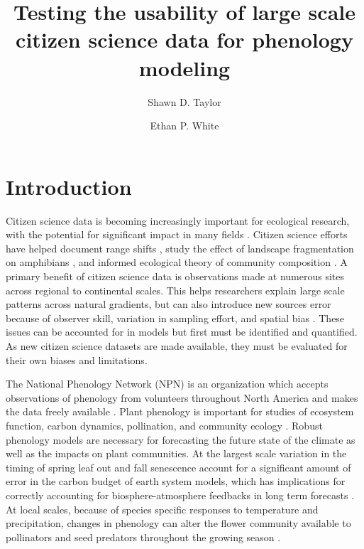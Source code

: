 \documentclass[fleqn,10pt,lineno]{wlpeerj} %
\title{Testing the usability of large scale citizen science data for phenology modeling}
\author[1]{Shawn D. Taylor}
\author[2]{Ethan P. White}
\affil[1]{UFL}
\affil[2]{UFL}
\begin{document}
\flushbottom
\maketitle
\thispagestyle{empty}

\section*{Introduction}

Citizen science data is becoming increasingly important for ecological research, with the potential for significant impact in many fields \citep{dickinson2010, tulloch2013, kelling2009}. Citizen science efforts have helped document range shifts \citep{hitch2007}, study the effect of landscape fragmentation on amphibians \citep{cosentino2014}, and informed ecological theory of community composition \citep{locey2013}. A primary benefit of citizen science data is observations made at numerous sites across regional to continental scales. This helps researchers explain large scale patterns across natural gradients, but can also introduce new sources error because of observer skill, variation in sampling effort, and spatial bias \citep{dickinson2010}. These issues can be accounted for in models but first must be identified and quantified. As new citizen science datasets are made available, they must be evaluated for their own biases and limitations.  

The National Phenology Network (NPN) is an organization which accepts observations of phenology from volunteers throughout North America and makes the data freely available \citep{schwartz2012a}. Plant phenology is important for studies of ecosystem function, carbon dynamics, pollination, and community ecology \citep{richardson2013, cleland2007, tang2016}. Robust phenology models are necessary for forecasting the future state of the climate as well as the impacts on plant communities. At the largest scale variation in the timing of spring leaf out and fall senescence account for a significant amount of error in the carbon budget of earth system models, which has implications for correctly accounting for biosphere-atmosphere feedbacks in long term forecasts \citep{richardson2012}. At local scales, because of species specific responses to temperature and precipitation, changes in phenology can alter the flower community available to pollinators and seed predators throughout the growing season \citep{diez2012, caradonna2014, ogilvie2017, theobald2017}. 
\end{document}
